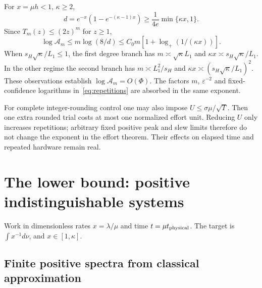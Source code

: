 \documentclass[11pt,a4paper]{article}
\begin{document}
For $x=\mu h<1$, $\kappa\geq2$,
\[
d=e^{-x}(1-e^{-(\kappa-1)x})\geq\frac1{4e}\min\{\kappa x,1\}.
\]
Since $T_m(z)\leq(2z)^m$ for $z\geq1$,
\begin{equation}\label{eq:coefficient-bound}
\log\mathcal A_m\leq m\log(8/d)
\leq C_0m[1+\log_+(1/(\kappa x))].
\end{equation}
When $s_H\sqrt\kappa/L_1\leq1$, the first degree branch has $m\asymp\sqrt\kappa L_1$ and $\kappa x\asymp s_H\sqrt\kappa/L_1$. In the other regime the second branch has $m\asymp L_1^2/s_H$ and $\kappa x\asymp(s_H\sqrt\kappa/L_1)^2$. These observations establish $\log\mathcal A_m=O(\Phi)$. The factors $m$, $\varepsilon^{-2}$ and fixed-confidence logarithms in~\eqref{eq:repetitions} are absorbed in the same exponent.

For complete integer-rounding control one may also impose $U\leq\sigma\mu/\sqrt T$. Then one extra rounded trial costs at most one normalized effort unit. Reducing $U$ only increases repetitions; arbitrary fixed positive peak and slew limits therefore do not change the exponent in the effort theorem. Their effects on elapsed time and repeated hardware remain real.

\section{The lower bound: positive indistinguishable systems}

Work in dimensionless rates $x=\lambda/\mu$ and time $t=\mu t_{\rm physical}$. The target is $\int x^{-1}d\nu$, and $x\in[1,\kappa]$.

\subsection{Finite positive spectra from classical approximation}
\end{document}
